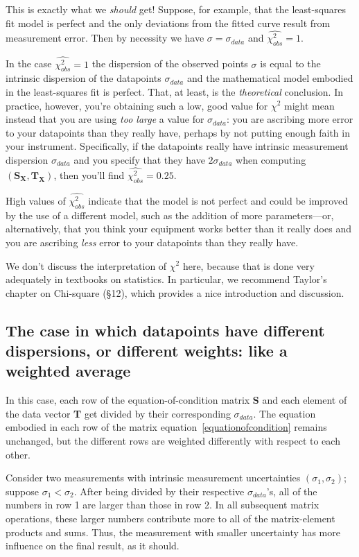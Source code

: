 {	This is exactly what we {\it should} get! Suppose, for example,
that the least-squares fit model is perfect and the only deviations from
the fitted curve result from measurement error.  Then by necessity we
have $\sigma = \sigma_{data}$ and $\widehat{\chi_{obs}^2} = 1$. 

	In the case $\widehat{\chi_{obs}^2} = 1$ the dispersion of the
observed points $\sigma$ is equal to the intrinsic dispersion of the
datapoints $\sigma_{data}$ and the mathematical model embodied in the
least-squares fit is perfect.  That, at least, is the {\it theoretical}
conclusion.  In practice, however, you're obtaining such a low, good
value for $\chi^2$ might mean instead that you are using {\it too large}
a value for $\sigma_{data}$: you are ascribing more error to your
datapoints than they really have, perhaps by not putting enough faith in
your instrument.  Specifically, if the datapoints really have intrinsic
measurement dispersion $\sigma_{data}$ and you specify that they have $2
\sigma_{data}$ when computing $(\mathbf{S_X},\mathbf{T_X})$, then you'll
find $\widehat{\chi_{obs}^2} = 0.25$. 

	High values of $\widehat{\chi_{obs}^2}$ indicate that the model
is not perfect and could be improved by the use of a different model,
such as the addition of more parameters---or, alternatively, that you
think your equipment works better than it really does and you are
ascribing {\it less} error to your datapoints than they really have. 

	We don't discuss the interpretation of $\chi^2$ here, because
that is done very adequately in textbooks on statistics. In particular,
we recommend Taylor's chapter on Chi-square (\S 12), which provides a
nice introduction and discussion. 

\subsection{The case in which datapoints have different dispersions,
or different weights: like a weighted average}

\label{weightedcase}

	In this case, each row of the equation-of-condition matrix {\bf
S} and each element of the data vector {\bf T} get divided by their
corresponding $\sigma_{data}$.  The equation embodied in each row of the
matrix equation~\ref{equationofcondition} remains unchanged, but the
different rows are weighted differently with respect to each other. 

	Consider two measurements with intrinsic measurement
uncertainties $(\sigma_1, \sigma_2)$; suppose $\sigma_1 < \sigma_2$. 
After being divided by their respective $\sigma_{data}$'s, all of the
numbers in row 1 are larger than those in row 2.  In all subsequent
matrix operations, these larger numbers contribute more to all of the
matrix-element products and sums.  Thus, the measurement with smaller
uncertainty has more influence on the final result, as it should. 

}
